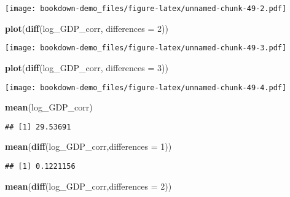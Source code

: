 \documentclass[]{book}
\newenvironment{Shaded}{\begin{snugshade}}{\end{snugshade}}
\newcommand{\KeywordTok}[1]{\textcolor[rgb]{0.13,0.29,0.53}{\textbf{#1}}}
\newcommand{\DataTypeTok}[1]{\textcolor[rgb]{0.13,0.29,0.53}{#1}}
\newcommand{\DecValTok}[1]{\textcolor[rgb]{0.00,0.00,0.81}{#1}}
\newcommand{\NormalTok}[1]{#1}
\theoremstyle{definition}
\theoremstyle{definition}
\theoremstyle{definition}
\theoremstyle{remark}
\begin{document}
\texttt{[image: bookdown-demo\_files/figure-latex/unnamed-chunk-49-2.pdf]}

\begin{Shaded}
\begin{Highlighting}[]
\KeywordTok{plot}\NormalTok{(}\KeywordTok{diff}\NormalTok{(log_GDP_corr, }\DataTypeTok{differences =} \DecValTok{2}\NormalTok{))}
\end{Highlighting}
\end{Shaded}

\texttt{[image: bookdown-demo\_files/figure-latex/unnamed-chunk-49-3.pdf]}

\begin{Shaded}
\begin{Highlighting}[]
\KeywordTok{plot}\NormalTok{(}\KeywordTok{diff}\NormalTok{(log_GDP_corr, }\DataTypeTok{differences =} \DecValTok{3}\NormalTok{))}
\end{Highlighting}
\end{Shaded}

\texttt{[image: bookdown-demo\_files/figure-latex/unnamed-chunk-49-4.pdf]}

\begin{Shaded}
\begin{Highlighting}[]
\KeywordTok{mean}\NormalTok{(log_GDP_corr)}
\end{Highlighting}
\end{Shaded}

\begin{verbatim}
## [1] 29.53691
\end{verbatim}

\begin{Shaded}
\begin{Highlighting}[]
\KeywordTok{mean}\NormalTok{(}\KeywordTok{diff}\NormalTok{(log_GDP_corr,}\DataTypeTok{differences =} \DecValTok{1}\NormalTok{))}
\end{Highlighting}
\end{Shaded}

\begin{verbatim}
## [1] 0.1221156
\end{verbatim}

\begin{Shaded}
\begin{Highlighting}[]
\KeywordTok{mean}\NormalTok{(}\KeywordTok{diff}\NormalTok{(log_GDP_corr,}\DataTypeTok{differences =} \DecValTok{2}\NormalTok{))}
\end{Highlighting}
\end{Shaded}
\end{document}
